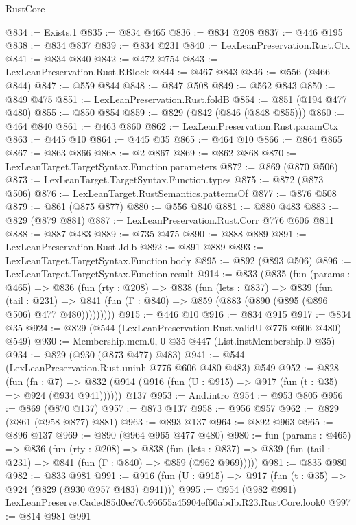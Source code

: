 \begin{lexlean}{RustCore}
\begin{coremodule}
@834 := Exists.{1}
@835 := @834 @465
@836 := @834 @208
@837 := @446 @195
@838 := @834 @837
@839 := @834 @231
@840 := LexLeanPreservation.Rust.Ctx
@841 := @834 @840
@842 := @472 @754
@843 := LexLeanPreservation.Rust.RBlock
@844 := @467 @843
@846 := @556 (@466 @844)
@847 := @559 @844
@848 := @847 @508
@849 := @562 @843
@850 := @849 @475
@851 := LexLeanPreservation.Rust.foldB
@854 := @851 (@194 @477 @480)
@855 := @850 @854
@859 := @829 (@842 (@846 (@848 @855)))
@860 := @464 @840
@861 := @463 @860
@862 := LexLeanPreservation.Rust.paramCtx
@863 := @445 @10
@864 := @445 @35
@865 := @464 @10
@866 := @864 @865
@867 := @863 @866
@868 := @2 @867
@869 := @862 @868
@870 := LexLeanTarget.TargetSyntax.Function.parameters
@872 := @869 (@870 @506)
@873 := LexLeanTarget.TargetSyntax.Function.types
@875 := @872 (@873 @506)
@876 := LexLeanTarget.RustSemantics.patternsOf
@877 := @876 @508
@879 := @861 (@875 @877)
@880 := @556 @840
@881 := @880 @483
@883 := @829 (@879 @881)
@887 := LexLeanPreservation.Rust.Corr @776 @606 @811
@888 := @887 @483
@889 := @735 @475
@890 := @888 @889
@891 := LexLeanPreservation.Rust.Jd.b
@892 := @891 @889
@893 := LexLeanTarget.TargetSyntax.Function.body
@895 := @892 (@893 @506)
@896 := LexLeanTarget.TargetSyntax.Function.result
@914 := @833
    (@835
      (fun (params : @465) =>
      @836
        (fun (rty : @208) =>
        @838
          (fun (lets : @837) =>
          @839
            (fun (tail : @231) =>
            @841 (fun (Γ : @840) => @859 (@883 (@890 (@895 (@896 @506) @477 @480)))))))))
@915 := @446 @10
@916 := @834 @915
@917 := @834 @35
@924 := @829 (@544 (LexLeanPreservation.Rust.validU @776 @606 @480) @549)
@930 := Membership.mem.{0, 0} @35 @447 (List.instMembership.{0} @35)
@934 := @829 (@930 (@873 @477) @483)
@941 := @544 (LexLeanPreservation.Rust.uninh @776 @606 @480 @483) @549
@952 := @828
    (fun (fn : @7) =>
    @832 (@914 (@916 (fun (U : @915) => @917 (fun (t : @35) => @924 (@934 @941))))))
    @137
@953 := And.intro
@954 := @953 @805
@956 := @869 (@870 @137)
@957 := @873 @137
@958 := @956 @957
@962 := @829 (@861 (@958 @877) @881)
@963 := @893 @137
@964 := @892 @963
@965 := @896 @137
@969 := @890 (@964 @965 @477 @480)
@980 := fun (params : @465) =>
  @836
    (fun (rty : @208) =>
    @838
      (fun (lets : @837) => @839 (fun (tail : @231) => @841 (fun (Γ : @840) => @859 (@962 @969)))))
@981 := @835 @980
@982 := @833 @981
@991 := @916 (fun (U : @915) => @917 (fun (t : @35) => @924 (@829 (@930 @957 @483) @941)))
@995 := @954 (@982 @991) LexLeanPreserve.Caded85d0ec70c96655a45904ef60abdb.R23.RustCore.look0
@997 := @814 @981 @991

\end{coremodule}
\end{lexlean}
